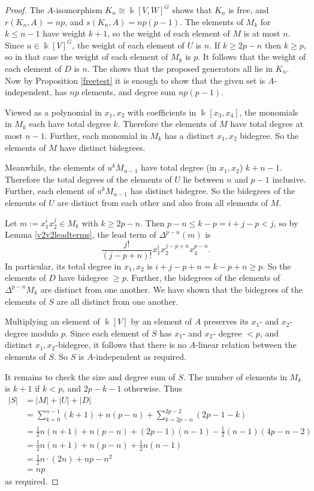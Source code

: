\documentclass[a4paper]{amsart}
\newcommand{\kk}{\Bbbk}
\newtheorem*{Corollary of Conjecture}{Corollary of Conjecture}
\theoremstyle{definition}
\theoremstyle{remark}
\theoremstyle{Acknowledgments}
\begin{document}
\begin{proof}
The $A$-isomorphism $K_n \cong \kk[V,W]^G$ shows that $K_n$ is free, and $r(K_n,A) = np$, and $s(K_n,A) = np(p-1)$. 
The elements of $M_k$ for $k \leq n-1$ have weight $k+1$, so the weight of each element of $M$ is at most $n$. Since $u \in \kk[V]^G$, the weight of each element of $U$ is $n$. If $k \geq 2p-n$ then $k \geq p$, so in that case the weight of each element of $M_k$ is $p$. It follows that the weight of each element of $D$ is $n$. The shows that the proposed generators all lie in $K_n$. Now by Proposition \ref{freetest} it is enough to show that the given set is $A$-independent, has $np$ elements, and degree sum $np(p-1)$.

Viewed as a polynomial in $x_1,x_2$ with coefficients in $\kk[x_3,x_4]$, the monomials in $M_k$ each have total degree $k$. Therefore the elements of $M$ have total degree at most $n-1$. Further, each monomial in $M_k$ has a distinct $x_1,x_2$ bidegree. So the elements of $M$ have distinct bidegrees.

Meanwhile, the elements of $u^kM_{n-1}$ have total degree (in $x_1,x_2$) $k+n-1$. Therefore the total degrees of the elements of $U$ lie between $n$ and $p-1$ inclusive. Further, each element of $u^kM_{n-1}$ has distinct bidegree. So the bidegrees of the elements of $U$ are distinct from each other and also from all elements of $M$.

Let $m:= x_1^ix_2^j \in M_k$ with $k \geq 2p-n$. Then $p-n \leq k-p = i+j-p < j$, so by Lemma \ref{v2v2leadterms}, the lead term of $\Delta^{p-n}(m)$ is $$\frac{j!}{(j-p+n)!}x_1^ix_2^{j-p+n}x_4^{p-n}.$$
In particular, its total degree in $x_1,x_2$ is $i+j-p+n = k-p+n \geq p$. So the elements of $D$ have bidegree $\geq p$. Further, the bidegrees of the elements of $\Delta^{p-n}M_k$ are distinct from one another. We have shown that the bidegrees of the elements of $S$ are all distinct from one another.  

Multiplying an element of $\kk[V]$ by an element of $A$ preserves its $x_1$- and $x_2$- degree modulo $p$. Since each element of $S$ has $x_1$- and $x_2$- degree $<p$, and distinct $x_1,x_2$-bidegree, it follows that there is no $A$-linear relation between the elements of $S$. So $S$ is $A$-independent as required.

It remains to check the size and degree sum of $S$. The number of elements in $M_k$ is $k+1$ if $k < p$, and $2p-k-1$ otherwise. Thus
\begin{align*}
|S| &= |M|+|U|+|D|\\
&= \sum_{k=0}^{n-1} (k+1) + n(p-n) + \sum_{k=2p-n}^{2p-2} (2p-1-k)\\
&= \frac12 n(n+1) + n(p-n) + (2p-1)(n-1) - \frac12(n-1)(4p-n-2)\\
&= \frac12 n(n+1) + n(p-n) + \frac12 n(n-1)\\
&= \frac12 n \cdot (2n) + np-n^2\\
&=np
\end{align*}
as required. 


\end{proof}
\end{document}
